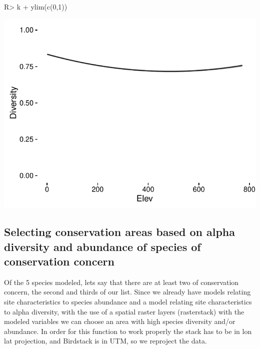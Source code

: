 \documentclass[article]{jss}
\begin{document}
\begin{CodeChunk}
\begin{CodeInput}
R> k + ylim(c(0,1))
\end{CodeInput}


\begin{center}\includegraphics{diversityocc_files/figure-latex/unnamed-chunk-21-3} \end{center}

\end{CodeChunk}

\subsection{Selecting conservation areas based on alpha diversity and
abundance of species of conservation
concern}\label{selecting-conservation-areas-based-on-alpha-diversity-and-abundance-of-species-of-conservation-concern}

Of the 5 species modeled, lets say that there are at least two of
conservation concern, the second and thirds of our list. Since we
already have models relating site characteristics to species abundance
and a model relating site characteristics to alpha diversity, with the
use of a spatial raster layers (rasterstack) with the modeled variables
we can choose an area with high species diversity and/or abundance. In
order for this function to work properly the stack has to be in lon lat
projection, and Birdstack is in UTM, so we reproject the data.
\end{document}
